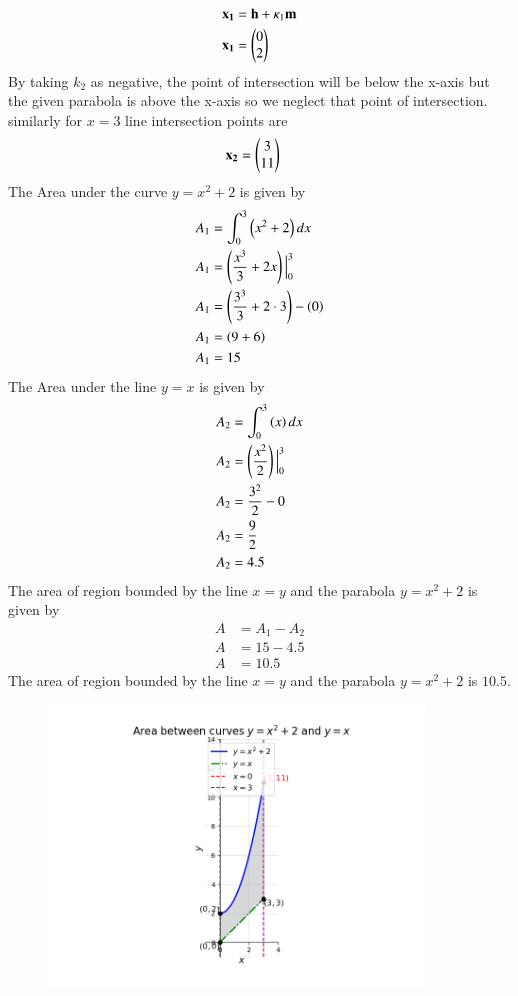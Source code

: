 \documentclass[journal]{IEEEtran}
\begin{document}
\begin{align}
\mathbf{x_1} &= \mathbf{h}+\kappa_1\mathbf{m}\\
\mathbf{x_1} &= \begin{pmatrix}0\\2\end{pmatrix}
\end{align}
By taking $k_2$ as negative, the point of intersection will be below the x-axis but the given parabola is above the x-axis so we neglect that point of intersection.\\
similarly for $x=3$ line intersection points are
\begin{align}
    \mathbf{x_2} &= \begin{pmatrix}3\\11\end{pmatrix}
\end{align}
The Area under the curve $y=x^2+2$ is given by
\begin{align}
A_1 &= \int_{0}^{3}\left(x^2+2\right)dx\\
A_1 &= \left(\frac{x^3}{3} + 2x\right) \Big|_0^3\\
A_1 &= \left(\frac{3^3}{3} + 2\cdot 3\right) - \left(0\right)\\
A_1 &= \left(9 + 6\right)\\
A_1 &= 15
\end{align}
The Area under the line $y=x$ is given by
\begin{align}
A_2 &= \int_{0}^{3}\left(x\right)dx\\
A_2 &= \left(\frac{x^2}{2}\right) \Big|_0^3\\
A_2 &= \frac{3^2}{2} - 0\\
A_2 &= \frac{9}{2}\\
A_2 &= 4.5
\end{align}
The area of region bounded by the line $x=y$ and the parabola $y=x^2+2$ is given by
\begin{align}
A &= A_1-A_2\\
A &= 15 - 4.5\\
A &= 10.5
\end{align}
The area of region bounded by the line $x=y$ and the parabola $y=x^2+2$ is $10.5$.
\begin{figure}[htp]
    \centering
    \includegraphics[width=10cm]{figs/Figure_1.png}
\end{figure}
\end{document}
